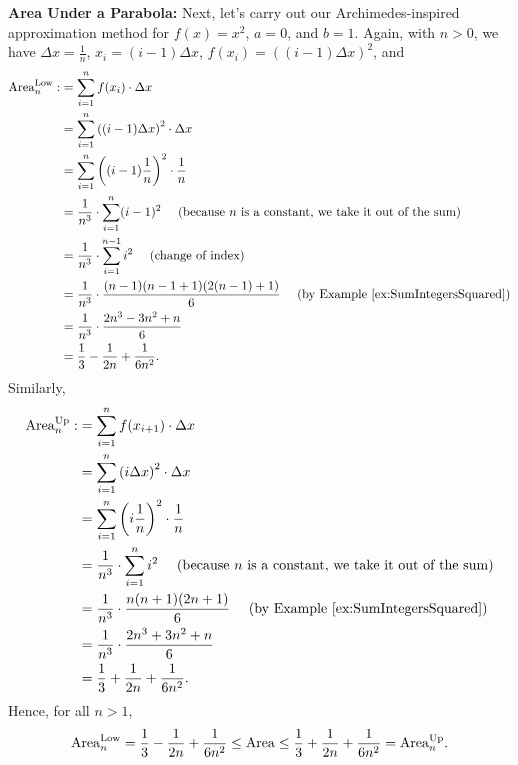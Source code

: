 \textbf{Area Under a Parabola:} Next, let's carry out our Archimedes-inspired approximation method for $f(x)=x^2$, $a=0$, and $b=1$. Again, with $n>0$, we have $\Delta x =\frac{1}{n}$, $x_i = (i-1) \Delta x$, $f(x_i)= \left((i-1) \Delta x \right)^2$, and 
\begin{equation}
\begin{aligned}
    {\rm Area}^{\rm Low}_n :&=   \sum_{i=1}^n f(x_i)\cdot \Delta x \\
    &=   \sum_{i=1}^n \left((i-1) \Delta x \right)^2 \cdot \Delta x  \\
    &=  \sum_{i=1}^n \left((i-1) \frac{1}{n}\right)^2 \cdot \frac{1}{n} \\
    &= \frac{1}{n^3} \cdot  \sum_{i=1}^n (i-1)^2 ~~~~(\text{because } n \text{ is a constant, we take it out of the sum}) \\
     &= \frac{1}{n^3} \cdot  \sum_{i=1}^{n-1} i^2 ~~~~(\text{change of index}) \\
    &= \frac{1}{n^3} \cdot \frac{(n-1)(n -1 + 1)(2(n-1) + 1) }{6} ~~~~(\text{by Example }\ref{ex:SumIntegersSquared})\\
    & = \frac{1}{n^3} \cdot \frac{2n^3 - 3n^2 + n}{6} \\
    &= \frac{1}{3} - \frac{1}{2n} + \frac{1}{6n^2}.
\end{aligned}
\end{equation}
Similarly, 
\begin{equation}
\begin{aligned}
    {\rm Area}^{\rm Up}_n :&=   \sum_{i=1}^{n} f(x_{i+1})\cdot \Delta x \\
    &=   \sum_{i=1}^n \left(i \Delta x\right)^2 \cdot \Delta x  \\
    &=  \sum_{i=1}^n\left(i \frac{1}{n}\right)^2 \cdot \frac{1}{n} \\
    &= \frac{1}{n^3} \cdot  \sum_{i=1}^n i^2 ~~~~(\text{because } n \text{ is a constant, we take it out of the sum}) \\
    &= \frac{1}{n^3} \cdot \frac{n(n + 1)(2n + 1)}{6}  ~~~~(\text{by Example }\ref{ex:SumIntegersSquared})\\
    &= \frac{1}{n^3} \cdot \frac{2n^3 + 3n^2 + n}{6} \\
    &= \frac{1}{3} + \frac{1}{2n} + \frac{1}{6n^2}.
\end{aligned}
\end{equation}
Hence, for all $n > 1$, 
\begin{equation}
    \label{eqn:AreaparabolaBounds}
    {\rm Area}^{\rm Low}_n =   \frac{1}{3} - \frac{1}{2n} + \frac{1}{6n^2} \le {\rm Area} \le \frac{1}{3} + \frac{1}{2n} + \frac{1}{6n^2} = {\rm Area}^{\rm Up}_n.
\end{equation}
